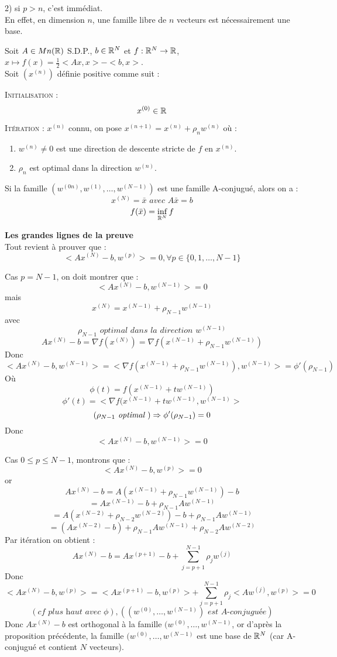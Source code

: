 2) si $p>n$, c'est immédiat.\\ En effet, en dimension $n$, une famille libre de $n$ vecteurs est nécessairement une base.



\begin{proposition}

Soit $A \in Mn(\mathbb{R})$ S.D.P., $b\in\mathbb{R}^N$ et $f:\mathbb{R}^N\rightarrow\mathbb{R}$, \\ $x\mapsto f(x)=\frac{1}{2}<Ax,x>-<b,x>$.\\
Soit $(x^{(n)})$ définie positive comme suit :

\textsc{Initialisation :}
\[x^{(0)}\in\mathbb{R}\]

\textsc{Itération :}
$x^{(n)}$ connu, on pose $x^{(n+1)}=x^{(n)}+\rho_n w^{(n)}$ où :
\begin{enumerate}
\item $w^{(n)} \ne 0$ est une direction de descente stricte de $f$ en $x^{(n)}$.
\item $\rho_n$ est optimal dans la direction $w^{(n)}$.
\end{enumerate}

Si la famille $(w^{(0n)}, w^{(1)}, \dots, w^{(N-1)})$ est une famille A-conjugué, alors on a :
\[ x^{(N)}=\bar{x} \textit{ avec } A\bar{x}=b \]
\[ f(\bar{x})=\inf_{\mathbb{R}^N} f \]

\end{proposition}

\textbf{Les grandes lignes de la preuve}\\
Tout revient à prouver que :
\[<Ax^{(N)}-b,w^{(p)}> = 0, \forall p \in \{0,1,\dots,N-1\}\]

Cas $p=N-1$, on doit montrer que :
\[<Ax^{(N)}-b,w^{(N-1)}> = 0\]
mais \[ x^{(N)}=x^{(N-1)}+\rho_{N-1}w^{(N-1)} \]
avec \[ \rho_{N-1} \textit{ optimal dans la direction } w^{(N-1)} \] 
\[ Ax^{(N)}-b=\nabla f(x^{(N)}) = \nabla f(x^{(N-1)}+\rho_{N-1}w^{(N-1)}) \]
Donc \[ <Ax^{(N)}-b,w^{(N-1)}> = <\nabla f(x^{(N-1)}+\rho_{N-1}w^{(N-1)}), w^{(N-1)}>=\phi '(\rho_{N-1}) \]
Où \[ \phi (t)=f(x^{(N-1)}+tw^{(N-1)}) \]
\[ \phi'(t)=<\nabla f(x^{(N-1)}+tw^{(N-1)}, w^{(N-1)}>\]
\[ (\rho_{N-1} \textit{ optimal }) \Rightarrow \phi'(\rho_{N-1})=0 \]
Donc \[ <Ax^{(N)}-b,w^{(N-1)}>=0 \]

Cas $0\leq p \leq N-1$, montrons que :
\[ <Ax^{(N)}-b,w^{(p)}>=0 \]
or \[ Ax^{(N)}-b=A(x^{(N-1)}+\rho_{N-1}w^{(N-1)})-b \]
\[ =Ax^{(N-1)}-b+\rho_{N-1}Aw^{(N-1)} \]
\[ =A(x^{(N-2)}+\rho_{N-2}w^{(N-2)})-b+\rho_{N-1}Aw^{(N-1)} \]
\[ =(Ax^{(N-2)}-b)+\rho_{N-1}Aw^{(N-1)}+\rho_{N-2}Aw^{(N-2)} \]
Par itération on obtient :
\[ Ax^{(N)}-b=Ax^{(p+1)}-b+\sum_{j=p+1}^{N-1}\rho_jw^{(j)} \]
Donc \[ <Ax^{(N)}-b,w^{(p)}>=<Ax^{(p+1)}-b,w^{(p)}>+\sum_{j=p+1}^{N-1}\rho_j<Aw^{(j)},w^{(p)}>=0 \]
\[(\textit{cf plus haut avec }\phi), ((w^{(0)}, \dots, w^{(N-1)}) \textit{ est A-conjuguée}) \]
Donc $Ax^{(N)}-b$ est orthogonal à la famille $(w^{(0)}, \dots, w^{(N-1)}$, or d'après la proposition précédente, la famille $(w^{(0)}, \dots, w^{(N-1)}$ est une base de $\mathbb{R}^N$ (car A-conjugué et contient $N$ vecteurs).


